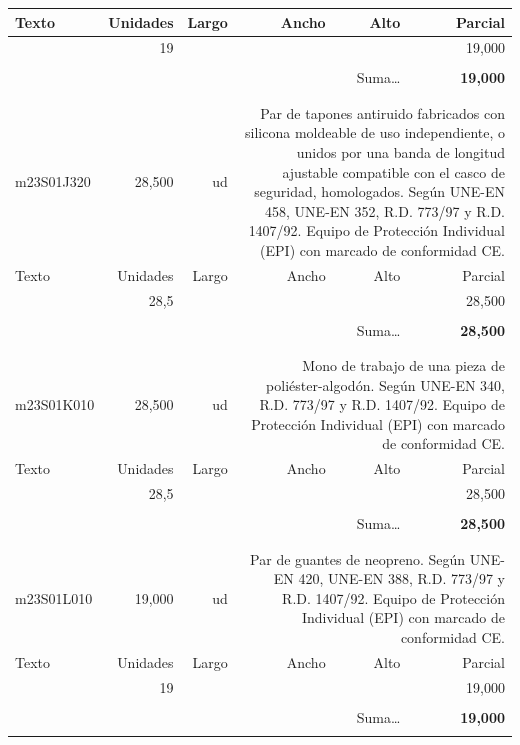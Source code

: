 \documentclass{book}%
\begin{document}
\begin{longtable}{lrrrrr}
Texto&Unidades&Largo&Ancho&Alto&Parcial\\%
\hline%
\multicolumn{1}{p{3.5cm}}{ }&19&&&&    19,000\\%
&&&&&\\%
\multicolumn{5}{r}{Suma\ldots}&\textbf{    19,000}\\%
\hline%
&&&&&\\%
&&&&&\\%
m23S01J320&    28,500& ud&\multicolumn{3}{p{6cm}}{\scriptsize Par de tapones antiruido fabricados con silicona moldeable de uso independiente, o unidos por una banda de longitud ajustable compatible con el casco de seguridad, homologados. Según UNE-EN 458, UNE-EN 352, R.D. 773/97 y R.D. 1407/92. Equipo de Protección Individual (EPI) con marcado de conformidad CE.\normalsize}\\%
Texto&Unidades&Largo&Ancho&Alto&Parcial\\%
\hline%
\multicolumn{1}{p{3.5cm}}{ }&28,5&&&&    28,500\\%
&&&&&\\%
\multicolumn{5}{r}{Suma\ldots}&\textbf{    28,500}\\%
\hline%
&&&&&\\%
&&&&&\\%
m23S01K010&    28,500& ud&\multicolumn{3}{p{6cm}}{\scriptsize Mono de trabajo de una pieza de poliéster-algodón. Según UNE-EN 340, R.D. 773/97 y R.D. 1407/92. Equipo de Protección Individual (EPI) con marcado de conformidad CE.\normalsize}\\%
Texto&Unidades&Largo&Ancho&Alto&Parcial\\%
\hline%
\multicolumn{1}{p{3.5cm}}{ }&28,5&&&&    28,500\\%
&&&&&\\%
\multicolumn{5}{r}{Suma\ldots}&\textbf{    28,500}\\%
\hline%
&&&&&\\%
&&&&&\\%
m23S01L010&    19,000& ud&\multicolumn{3}{p{6cm}}{\scriptsize Par de guantes de neopreno. Según UNE-EN 420, UNE-EN 388, R.D. 773/97 y R.D. 1407/92. Equipo de Protección Individual (EPI) con marcado de conformidad CE.\normalsize}\\%
Texto&Unidades&Largo&Ancho&Alto&Parcial\\%
\hline%
\multicolumn{1}{p{3.5cm}}{ }&19&&&&    19,000\\%
&&&&&\\%
\multicolumn{5}{r}{Suma\ldots}&\textbf{    19,000}\\%
\hline%
&&&&&\\%

\end{longtable}
\end{document}
